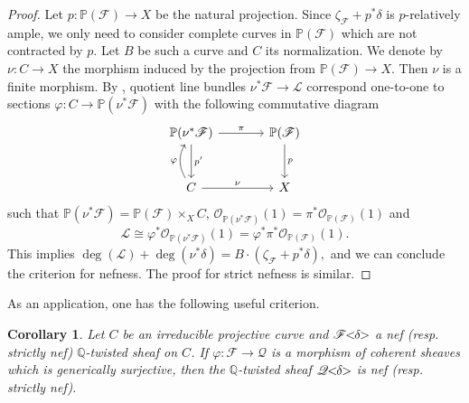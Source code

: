 \documentclass[english,reqno]{amsart}
\newcommand\bbP{{\mathbb P}}
\newcommand\bbQ{{\mathbb Q}}
\newcommand\sF{{\mathscr F}}
\newcommand\sL{{\mathscr L}}
\newcommand\sO{{\mathscr O}}
\newcommand\sQ{{\mathscr Q}}
\theoremstyle{plain}
\newtheorem{cor}[thm]{Corollary}
\theoremstyle{definition}
\numberwithin{equation}{section} %
\begin{document}
\begin{proof}
    Let $p\colon \mathbb{P}(\sF) \to X$ be the natural projection.
    Since $\zeta_\sF+p^*\delta$ is $p$-relatively ample,  we only need to consider complete curves in $\mathbb{P}(\sF)$ which are not contracted by $p$.
    Let $B$ be such a curve and $C$ its normalization. We denote by $\nu \colon C\to X$ the morphism induced by the projection from $\bbP(\sF)\rightarrow X$. Then $\nu$ is a finite morphism.
  By \cite[(4.1.3) and Proposition 4.2.3]{Grothendieck1961},  quotient line bundles $\nu^*\sF\rightarrow \sL$ correspond one-to-one  to  sections $\varphi\colon C\rightarrow \bbP(\nu^*\sF)$ with the following commutative diagram
     \[
    \begin{tikzcd}[column sep=large, row sep=large]
        \bbP(\nu^*\sF)\ar[r,"{\pi}"] \ar[d,"{p'}"]  & \bbP(\sF)\ar[d,"{p}"]\\
        C\ar[r,"{\nu}"] \arrow[bend left]{u}{\varphi}    &  X
    \end{tikzcd}
    \]
    such that
        $\bbP(\nu^*\sF)=\bbP(\sF)\times_{X} C$, $\sO_{\bbP(\nu^*\sF)}(1)=\pi^*\sO_{\bbP(\sF)}(1)$
    and
    \[\sL\cong  \varphi^*\sO_{\bbP(\nu^*\sF)}(1)=\varphi^*\pi^*\sO_{\bbP(\sF)}(1).\]
This implies $
        \deg(\sL)+\deg(\nu^*\delta) =  B\cdot (\zeta_\sF+p^*\delta),
    $
and we can conclude the criterion for nefness. The proof for strict nefness is similar.
\end{proof}

As an  application, one has the following useful criterion. %

\begin{cor}\label{Image-nef}
    Let $C$ be an irreducible projective curve and  $\sF\hspace{-0.8ex}<\hspace{-0.8ex}\delta\hspace{-0.8ex}>$  a nef (resp. strictly nef) $\bbQ$-twisted sheaf on $C$. If $\varphi\colon\sF\rightarrow \sQ$ is a morphism of coherent sheaves which is generically surjective, then the $\bbQ$-twisted sheaf $\sQ\hspace{-0.8ex}<\hspace{-0.8ex}\delta\hspace{-0.8ex}>$ is nef (resp. strictly nef).
\end{cor}
\end{document}
